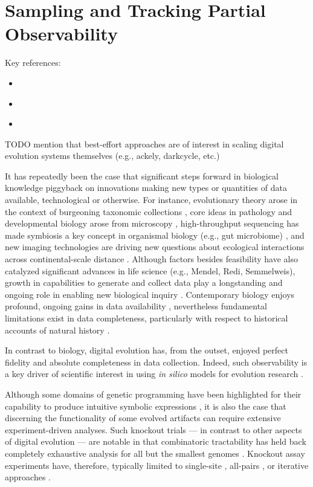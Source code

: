 \section{Sampling and Tracking Partial Observability}
\label{sec:best-effort}

Key references:
\begin{itemize}
\item \citep{moreno2022hereditary}
\item \citep{moreno2024guide}
\item \citep{moreno2024methods}
\end{itemize}

TODO mention that best-effort approaches are of interest in scaling digital evolution systems themselves (e.g., ackely, darkcycle, etc.)

\citep{moreno2022hstrat,moreno2024guide}

It has repeatedly been the case that significant steps forward in biological knowledge piggyback on innovations making new types or quantities of data available, technological or otherwise.
For instance, evolutionary theory arose in the context of burgeoning taxonomic collections \citep{winsor2009taxonomy}, core ideas in pathology and developmental biology arose from microscopy \citep{turner1890cell}, high-throughput sequencing has made symbiosis a key concept in organismal biology (e.g., gut microbiome) \citep{durack2019gut}, and new imaging technologies are driving new questions about ecological interactions across continental-scale distance \citep{stark2016toward}.
Although factors besides feasibility have also catalyzed significant advances in life science (e.g., Mendel, Redi, Semmelweis), growth in capabilities to generate and collect data play a longstanding and ongoing role in enabling new biological inquiry \citep{strasser2012data}.
Contemporary biology enjoys profound, ongoing gains in data availability \citep{sulston1983embryonic,sheth2017multiplex,weeks2023deep}, nevertheless fundamental limitations exist in data completeness, particularly with respect to historical accounts of natural history \citep{benton2011assessing,delsuc2005phylogenomics}.

In contrast to biology, digital evolution has, from the outset, enjoyed perfect fidelity and absolute completeness in data collection.
Indeed, such observability is a key driver of scientific interest in using \textit{in silico} models for evolution research \citep{o2003digital}.

Although some domains of genetic programming have been highlighted for their capability to produce intuitive symbolic expressions \citep{hu2023genetic,javed2022simplification}, it is also the case that discerning the functionality of some evolved artifacts can require extensive experiment-driven analyses.
Such knockout trials --- in contrast to other aspects of digital evolution --- are notable in that combinatoric tractability has held back completely exhaustive analysis for all but the smallest genomes \citep{nitash2021information}.
Knockout assay experiments have, therefore, typically limited to single-site \citep{adami2006digital}, all-pairs \citep{kumawat2023fluctuating}, or iterative approaches \citep{langdon2014improving,moreno2021case}.

